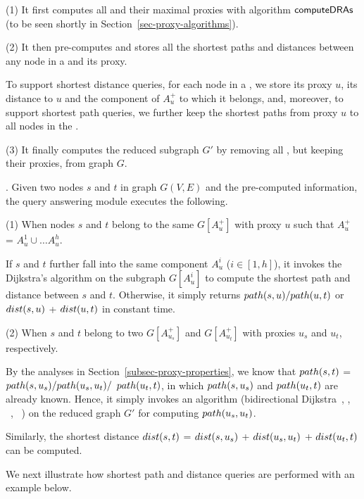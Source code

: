 \sstab (1) It first computes all \dras and their maximal proxies with algorithm ${\mathsf{computeDRAs}}$ (to be seen shortly in Section~\ref{sec-proxy-algorithms}).

\sstab (2) It then pre-computes and stores all the shortest paths and distances between any node in a \dra and its proxy.

To support shortest distance queries, for each node in a \dra, we store its proxy $u$, its distance to $u$ and the component of $A^{+}_u$ to which it belongs,
and, moreover, to support shortest path queries, we further keep the shortest paths from proxy $u$ to all nodes in the \dra.

\sstab (3) It finally computes the reduced subgraph $G'$ by removing all \dras, but keeping their proxies, from graph $G$. 


. Given two nodes $s$ and $t$ in graph $G(V, E)$  and the pre-computed information, the query answering module executes the following.


\sstab (1) When nodes $s$ and $t$ belong to the same \dra $G[A^+_u]$ with proxy $u$ such that $A^+_u$ = $A^1_u\cup\ldots A^h_u$.

If $s$ and $t$ further fall into the same component $A^i_u$ ($i\in[1,h]$), it invokes the Dijkstra's algorithm on the subgraph $G[A^i_u]$ to compute the shortest path and distance between $s$ and $t$. Otherwise, it simply returns $\path(s, u)/\path(u, t)$ or $\dist(s, u)$ + $\dist(u, t)$ in constant time.

\sstab (2)  When $s$ and $t$ belong to two \dras $G[A^+_{u_s}]$ and $G[A^+_{u_t}]$ with proxies $u_s$ and $u_t$, respectively.

By the analyses in Section~\ref{subsec-proxy-properties}, we know that $\path(s, t)$ = $\path(s, u_s)/\path(u_s, u_t)/$ $\path(u_t, t)$, in which $\path(s, u_s)$ and $\path(u_t, t)$ are already known. Hence, it simply invokes an algorithm (\eg bidirectional Dijkstra~\cite{LubyR89}, \arcflag \cite{MohringSSWW05}, \ch~\cite{GeisbergerSSD08}, \tnr~\cite{bast2014route}) on the reduced graph $G'$ for computing $\path(u_s, u_t)$.

Similarly, the shortest distance $\dist(s, t)$ = $\dist(s, u_s)$ + $\dist(u_s, u_t)$ + $\dist(u_t, t)$ can be computed.

We next illustrate how shortest path and distance queries are performed  with an example below.


